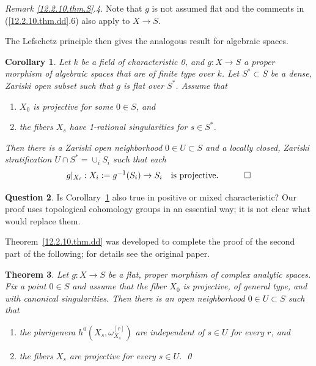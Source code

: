 \documentclass{amsart}
\newtheorem{thm}{Theorem}%
\newtheorem{cor}[thm]{Corollary}
\theoremstyle{definition}
\newtheorem{ques}[thm]{Question}    %
\theoremstyle{remark}
\newcommand{\qtq}[1]{\quad\mbox{#1}\quad}
\begin{document}
{\it Remark \ref{12.2.10.thm.S}.4.}   Note that $g$ is not  assumed flat and
the comments in (\ref{12.2.10.thm.dd}.6) also apply to $X\to S$. 
\medskip

The Lefschetz principle then gives the analogous result for algebraic spaces.


\begin{cor} \label{12.2.10.thm.S.cor} Let $k$ be a field of characteristic 0, and  $g:X\to S$  a  proper morphism of algebraic spaces that are of finite type over $k$. Let 
  $S^*\subset S$ be a dense, Zariski open subset  such that $g$ is flat over $S^*$.
Assume that
\begin{enumerate}
  \item $X_0$ is projective for some $0\in S$, and
\item the fibers $X_s$ have 1-rational singularities for $s\in S^*$.
\end{enumerate}
Then there is a Zariski  open neighborhood
$0\in U\subset S$ and a locally closed, Zariski stratification
$U\cap S^*=\cup_i S_i$ such that each
$$
g|_{X_i}:X_i:=g^{-1}(S_i)\to S_i \qtq{is projective.}\hfill\qed
$$
\end{cor}

\begin{ques} Is Corollary~\ref{12.2.10.thm.S.cor} also true in positive or mixed characteristic? Our proof uses topological cohomology groups in an essential way; it is not clear what would replace them.
  \end{ques}



Theorem~\ref{12.2.10.thm.dd} was developed to complete the proof of the second part of the following; for details see the original paper.

\begin{thm} \cite[Thm.1]{k-defgt} \label{mmp.extends.conj.thm.c.cor}
Let $g:X\to S$ be a flat, proper morphism of complex analytic spaces. 
Fix a point $0\in S$ and assume that the fiber
$X_0$ is  projective, of general type, and with  canonical  singularities.
Then   there is an open  neighborhood  $0\in U\subset S$ such that
\begin{enumerate}
\item the plurigenera  $h^0(X_s, \omega_{X_s}^{[r]})$ are independent of $s\in U$ for every $r$, and
\item  the fibers $X_s$ are  projective  for every $s\in U$.
 \qed
\end{enumerate}
\end{thm}
\end{document}
